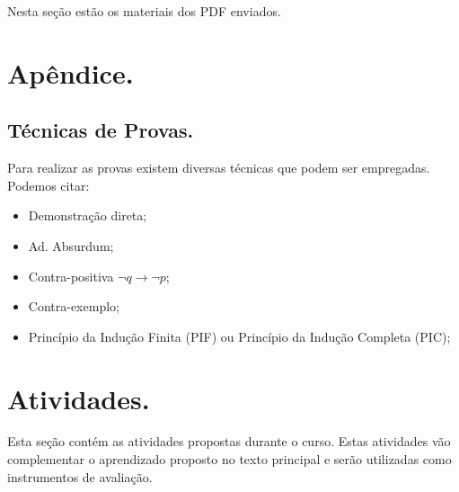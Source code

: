 \documentclass[a4paper,12pt]{article}
\begin{document}
Nesta seção estão os materiais dos PDF enviados.





\section{Apêndice.}

\subsection{Técnicas de Provas.}

Para realizar as provas existem diversas técnicas que podem ser empregadas. Podemos citar:
\begin{itemize}
\item Demonstração direta;
\item Ad. Absurdum;
\item Contra-positiva $\neg q \rightarrow \neg p$;
\item Contra-exemplo;
\item Princípio da Indução Finita (PIF) ou Princípio da Indução Completa (PIC);
\end{itemize}

\section{Atividades.}

Esta seção contém as atividades propostas durante o curso. Estas atividades vão complementar o aprendizado proposto no texto principal e serão utilizadas como instrumentos de avaliação.
\end{document}
